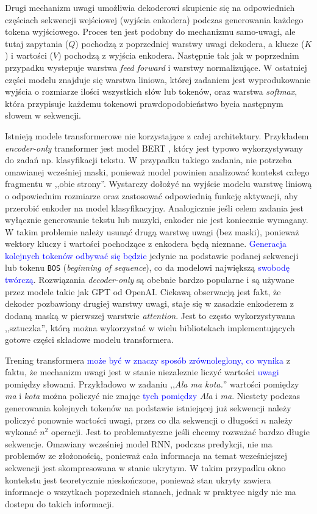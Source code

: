 \documentclass[data-science]{agh-wi} %
\begin{document}
Drugi mechanizm uwagi umożliwia dekoderowi skupienie się na odpowiednich częściach sekwencji wejściowej (wyjścia enkodera) podczas generowania każdego tokena wyjściowego. Proces ten jest podobny do mechanizmu samo-uwagi, ale tutaj zapytania ($Q$) pochodzą z poprzedniej warstwy uwagi dekodera, a klucze ($K$) i wartości ($V$) pochodzą z wyjścia enkodera. Następnie tak jak w poprzednim przypadku wystepuje warstwa \textit{feed forward} i warstwy normalizujące. W ostatniej części modelu znajduje się warstwa liniowa, której zadaniem jest wyprodukowanie wyjścia o rozmiarze ilości wszystkich słów lub tokenów, oraz warstwa \textit{softmax}, która przypisuje każdemu tokenowi prawdopodobieństwo bycia następnym słowem w sekwencji.

Istnieją modele transformerowe nie korzystające z całej architektury. Przykładem \textit{encoder-only} transformer jest model BERT \cite{bert}, który jest typowo wykorzystywany do zadań np. klasyfikacji tekstu. W przypadku takiego zadania, nie potrzeba omawianej wcześniej maski, ponieważ model powinien analizować kontekst całego fragmentu w ,,obie strony''. Wystarczy dołożyć na wyjście modelu warstwę liniową o odpowiednim rozmiarze oraz zastosować odpowiednią funkcję aktywacji, aby przerobić enkoder na model klasyfikacyjny.
Analogicznie jeśli celem zadania jest wyłącznie generowanie tekstu lub muzyki, enkoder nie jest koniecznie wymagany. W takim problemie należy usunąć drugą warstwę uwagi (bez maski), ponieważ wektory kluczy i wartości pochodzące z enkodera będą nieznane. \textcolor{blue}{Generacja kolejnych tokenów odbywać się będzie} jedynie na podstawie podanej sekwencji lub tokenu \texttt{BOS} (\textit{beginning of sequence}), co da modelowi największą \textcolor{blue}{swobodę twórczą}. Rozwiązania \textit{decoder-only} są obebnie bardzo popularne i są używane przez modele takie jak GPT od OpenAI. Ciekawą obserwacją jest fakt, że dekoder pozbawiony drugiej warstwy uwagi, staje się w zasadzie enkoderem z dodaną maską w pierwszej warstwie \textit{attention}. Jest to często wykorzystywana ,,sztuczka'', którą można wykorzystać w wielu bibliotekach implementujących gotowe części składowe modelu transformera.

Trening transformera \textcolor{blue}{może być w znaczy sposób zrównoleglony, co wynika} z faktu, że mechanizm uwagi jest w stanie niezaleznie liczyć wartości \textcolor{blue}{uwagi} pomiędzy słowami. Przykładowo w zadaniu ,,\textit{Ala ma kota.}'' wartości pomiędzy \textit{ma} i \textit{kota} można policzyć nie znając \textcolor{blue}{tych pomiędzy} \textit{Ala} i \textit{ma}. Niestety podczas generowania kolejnych tokenów na podstawie istniejącej już sekwencji należy policzyć ponownie wartości uwagi, przez co dla sekwencji o długości $n$ należy wykonać $n^2$ operacji. Jest to problematyczne jeśli chcemy rozważać bardzo długie sekwencje. Omawiany wcześniej model RNN, podczas predykcji, nie ma problemów ze złożonością, ponieważ cała informacja na temat wcześniejszej sekwencji jest skompresowana w stanie ukrytym. W takim przypadku okno kontekstu jest teoretycznie nieskończone, ponieważ stan ukryty zawiera informacje o wszytkach poprzednich stanach, jednak w praktyce nigdy nie ma dostepu do takich informacji.
\end{document}
